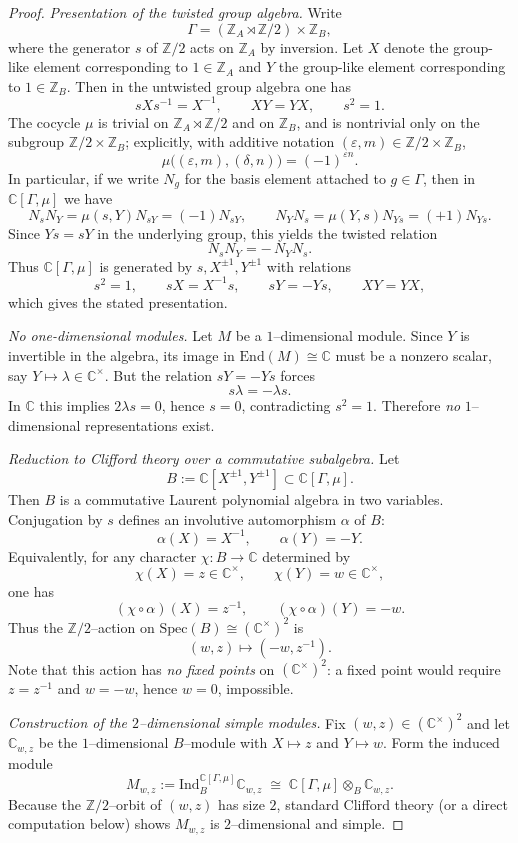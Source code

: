 \documentclass[11pt]{amsart}
\theoremstyle{remark}
\theoremstyle{definition}
\def\Spec{\mathrm{Spec}}
\def\Ind{\mathrm{Ind}}
\newcommand{\Z}{\mathbb{Z}}
\newcommand{\C}{\mathbb{C}}
\begin{document}
\begin{proof}
\emph{Presentation of the twisted group algebra.}
Write
\[
\Gamma=(\Z_A\rtimes \Z/2)\times \Z_B,
\]
where the generator $s$ of $\Z/2$ acts on $\Z_A$ by inversion.
Let $X$ denote the group-like element corresponding to $1\in \Z_A$
and $Y$ the group-like element corresponding to $1\in \Z_B$.
Then in the untwisted group algebra one has
\[
sXs^{-1}=X^{-1},\qquad XY=YX,\qquad s^2=1.
\]
The cocycle $\mu$ is trivial on $\Z_A\rtimes \Z/2$ and on $\Z_B$,
and is nontrivial only on the subgroup $\Z/2\times \Z_B$; explicitly,
with additive notation $(\varepsilon,m)\in \Z/2\times\Z_B$,
\[
\mu\bigl((\varepsilon,m),(\delta,n)\bigr)=(-1)^{\varepsilon n}.
\]
In particular, if we write $N_g$ for the basis element attached to $g\in\Gamma$,
then in $\C[\Gamma,\mu]$ we have
\[
N_sN_Y=\mu(s,Y)N_{sY}=(-1)N_{sY},\qquad
N_YN_s=\mu(Y,s)N_{Ys}=(+1)N_{Ys}.
\]
Since $Ys=sY$ in the underlying group, this yields the twisted relation
\[
N_sN_Y=-\,N_YN_s.
\]
Thus $\C[\Gamma,\mu]$ is generated by $s,X^{\pm1},Y^{\pm1}$ with relations
\[
s^2=1,\qquad sX=X^{-1}s,\qquad sY=-Ys,\qquad XY=YX,
\]
which gives the stated presentation.

\medskip
\emph{No one-dimensional modules.}
Let $M$ be a $1$--dimensional module. Since $Y$ is invertible in the algebra,
its image in $\mathrm{End}(M)\cong \C$ must be a nonzero scalar, say $Y\mapsto \lambda\in\C^\times$.
But the relation $sY=-Ys$ forces
\[
s\lambda = -\lambda s.
\]
In $\C$ this implies $2\lambda s=0$, hence $s=0$, contradicting $s^2=1$.
Therefore \emph{no} $1$--dimensional representations exist.

\medskip
\emph{Reduction to Clifford theory over a commutative subalgebra.}
Let
\[
B:=\C[X^{\pm1},Y^{\pm1}]\subset \C[\Gamma,\mu].
\]
Then $B$ is a commutative Laurent polynomial algebra in two variables.
Conjugation by $s$ defines an involutive automorphism $\alpha$ of $B$:
\[
\alpha(X)=X^{-1},\qquad \alpha(Y)=-Y.
\]
Equivalently, for any character $\chi:B\to\C$ determined by
\[
\chi(X)=z\in\C^\times,\qquad \chi(Y)=w\in\C^\times,
\]
one has
\[
(\chi\circ\alpha)(X)=z^{-1},\qquad (\chi\circ\alpha)(Y)=-w.
\]
Thus the $\Z/2$--action on $\Spec(B)\cong(\C^\times)^2$ is
\[
(w,z)\longmapsto(-w,z^{-1}).
\]
Note that this action has \emph{no fixed points} on $(\C^\times)^2$:
a fixed point would require $z=z^{-1}$ and $w=-w$, hence $w=0$, impossible.

\medskip
\emph{Construction of the $2$--dimensional simple modules.}
Fix $(w,z)\in(\C^\times)^2$ and let $\C_{w,z}$ be the $1$--dimensional $B$--module
with $X\mapsto z$ and $Y\mapsto w$.
Form the induced module
\[
M_{w,z}:=\Ind_{B}^{\C[\Gamma,\mu]}\C_{w,z}\;\cong\;\C[\Gamma,\mu]\otimes_B \C_{w,z}.
\]
Because the $\Z/2$--orbit of $(w,z)$ has size $2$, standard Clifford theory
(or a direct computation below) shows $M_{w,z}$ is $2$--dimensional and simple.


\end{proof}
\end{document}
